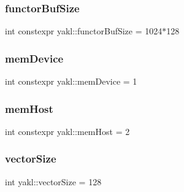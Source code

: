\subsubsection{\texorpdfstring{functor\+Buf\+Size}{functorBufSize}}
{\footnotesize\ttfamily int constexpr yakl\+::functor\+Buf\+Size = 1024$\ast$128}

\mbox{\label{namespaceyakl_ac3c32aec58c61e7f870081477ceee883}} 
\subsubsection{\texorpdfstring{mem\+Device}{memDevice}}
{\footnotesize\ttfamily int constexpr yakl\+::mem\+Device = 1}

\mbox{\label{namespaceyakl_aae8a8c910fec7cef7db68c9658c16405}} 
\subsubsection{\texorpdfstring{mem\+Host}{memHost}}
{\footnotesize\ttfamily int constexpr yakl\+::mem\+Host = 2}

\mbox{\label{namespaceyakl_a1ba339b7ce3e6f518d91ddba175c16d8}} 
\subsubsection{\texorpdfstring{vector\+Size}{vectorSize}}
{\footnotesize\ttfamily int yakl\+::vector\+Size = 128}

